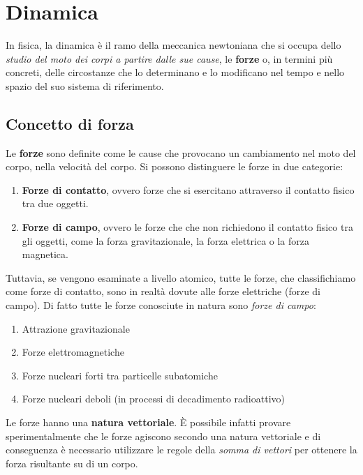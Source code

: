 \documentclass[a4paper,11pt,oneside]{book}
\begin{document}
\chapter{Dinamica}
In fisica, la dinamica è il ramo della meccanica newtoniana che si occupa dello \emph{studio del moto dei corpi a partire dalle sue cause}, le \textbf{forze}
o, in termini più concreti, delle circostanze che lo determinano e lo modificano nel tempo e nello spazio del suo sistema di riferimento.

\section{Concetto di forza}
Le \textbf{forze} sono definite come le cause che provocano un cambiamento nel moto del corpo, nella velocità del corpo.
Si possono distinguere le forze in due categorie:
\begin{enumerate}
    \item \textbf{Forze di contatto}, ovvero forze che si esercitano attraverso il contatto fisico tra due oggetti.
    \item \textbf{Forze di campo}, ovvero le forze che che non richiedono il contatto fisico tra gli oggetti, come la forza gravitazionale, la forza elettrica o la forza magnetica.
\end{enumerate}
Tuttavia, se vengono esaminate a livello atomico, tutte le forze, che classifichiamo come forze di contatto, sono in realtà dovute
alle forze elettriche (forze di campo). Di fatto tutte le forze conosciute in natura sono \emph{forze di campo}:
\begin{enumerate}
    \item Attrazione gravitazionale
    \item Forze elettromagnetiche
    \item Forze nucleari forti tra particelle subatomiche
    \item Forze nucleari deboli (in processi di decadimento radioattivo)
\end{enumerate}

\noindent Le forze hanno una \textbf{natura vettoriale}. È possibile infatti provare sperimentalmente che le forze agiscono secondo una
natura vettoriale e di conseguenza è necessario utilizzare le regole della \emph{somma di vettori} per ottenere la forza risultante su di un corpo.
\end{document}
